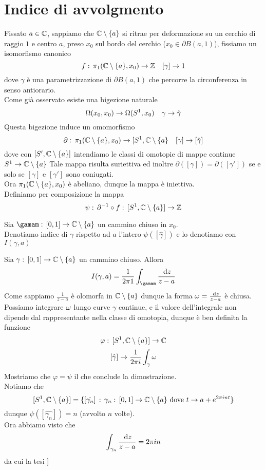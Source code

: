 

\section{Indice di avvolgmento}
Fissato $a\in \mathbb{C}$, sappiamo che $\mathbb{C}\setminus \{a  \}$ si ritrae per deformazione su un cerchio di raggio $1$ e centro $a$, preso $x_0$ sul bordo del cerchio ($x_0\in \partial B(a,1)$), fissiamo un isomorfismo canonico
$$ f:\, \pi_1(\mathbb{C}\setminus \{a \}, x_0) \to \mathbb{Z} \quad [\gamma] \to 1 $$
dove $\gamma$ \`e una parametrizzazione di $\partial B(a,1)$ che percorre la circonferenza in senso antiorario.\\
Come gi\`a osservato esiste  una bigezione naturale
$$ \Omega(x_0,x_0) \to \Omega(S^1, x_0) \quad \gamma \to \hat{\gamma}$$
Questa bigezione induce un omomorfismo 
$$\partial:\, \pi_1(\mathbb{C}\setminus\{ a \}, x_0) \to [ S^1, \mathbb{C} \setminus\{ a \} \quad [\gamma]\to [\hat{\gamma}]$$
dove con $[S', \mathbb{C} \setminus \{a \}]$ intendiamo le classi di omotopie di mappe continue $S^1\to \mathbb{C}\setminus\{a\}$
Tale mappa risulta suriettiva ed inoltre $\partial([\gamma]) = \partial([\gamma'])$ se e solo se $[\gamma]$ e $[\gamma']$ sono coniugati.\\
Ora $\pi_1(\mathbb{C}\setminus\{a\}, x_0)$ \`e abeliano, dunque la mappa \`e iniettiva.\\
Definiamo per composizione la mappa 
$$ \psi:\,  \partial^{-1}\circ f:\,[S^1, \mathbb{C}\setminus\{a\}] \to \mathbb{Z}$$
\begin{defn}Sia $\gamam:\, [0,1]\to \C\setminus \{a\}$ un cammino chiuso in $x_0$.\\
Denotiamo indice di $\gamma$ rispetto ad $a$ l'intero $\psi([\hat{\gamma}])$ e lo denotiamo con $I(\gamma, a)$
\end{defn}
\begin{thm}Sia $\gamma:\, [0,1]\to \mathbb{C}\setminus\{a\}$ un cammino chiuso. Allora 
$$ I(\gamma, a) = \frac{1}{2\pi 1 }\int_\gamam \frac{\dz}{z-a}$$
\proof Come sappiamo $\frac{1}{z-a}$ \`e olomorfa in $\mathbb{C}\setminus \{a\}$ dunque la forma $\omega=\frac{\, \mathrm{d}z}{z-a}$ \`e chiusa.\\
Possiamo integrare $\omega$ lungo curve $\gamma$ continue, e il valore dell'integrale non dipende dal rappresentante nella classe di omotopia, dunque \`e ben definita la funzione 
$$ \varphi:\, [S^1, \mathbb{C}\setminus\{a \}] \to \mathbb{C}$$ 
$$ [\hat{\gamma}]\to \frac{1}{2\pi i }\int_\gamma \omega $$
Mostriamo che $\varphi = \psi$ il che conclude la dimostrazione.\\
Notiamo che 
$$ [S^1, \mathbb{C}\setminus\{ a\}]  =\{ [\hat{\gamma_n}]\, : \, \gamma_n:\, [0,1]\to \mathbb{C}\setminus \{a\} \text{ dove } t \to a + e^{2\pi i n t}\}$$
dunque $\psi([\hat{\gamma_n}])  =n$ (avvolto $n$ volte).\\
Ora abbiamo visto che 
$$ \int_{\gamma_n} \frac{\, \mathrm{d}z}{z-a} =2\pi i n $$ 
da cui la tesi ]
\end{thm}
